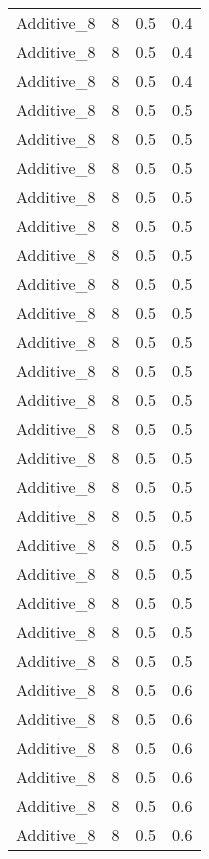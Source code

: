\documentclass{article}
\begin{document}
\begin{longtable}[H]{lrrr}
 Additive\_8 &       8 &   0.5 &            0.4 \\
 Additive\_8 &       8 &   0.5 &            0.4 \\
 Additive\_8 &       8 &   0.5 &            0.4 \\
 Additive\_8 &       8 &   0.5 &            0.5 \\
 Additive\_8 &       8 &   0.5 &            0.5 \\
 Additive\_8 &       8 &   0.5 &            0.5 \\
 Additive\_8 &       8 &   0.5 &            0.5 \\
 Additive\_8 &       8 &   0.5 &            0.5 \\
 Additive\_8 &       8 &   0.5 &            0.5 \\
 Additive\_8 &       8 &   0.5 &            0.5 \\
 Additive\_8 &       8 &   0.5 &            0.5 \\
 Additive\_8 &       8 &   0.5 &            0.5 \\
 Additive\_8 &       8 &   0.5 &            0.5 \\
 Additive\_8 &       8 &   0.5 &            0.5 \\
 Additive\_8 &       8 &   0.5 &            0.5 \\
 Additive\_8 &       8 &   0.5 &            0.5 \\
 Additive\_8 &       8 &   0.5 &            0.5 \\
 Additive\_8 &       8 &   0.5 &            0.5 \\
 Additive\_8 &       8 &   0.5 &            0.5 \\
 Additive\_8 &       8 &   0.5 &            0.5 \\
 Additive\_8 &       8 &   0.5 &            0.5 \\
 Additive\_8 &       8 &   0.5 &            0.5 \\
 Additive\_8 &       8 &   0.5 &            0.5 \\
 Additive\_8 &       8 &   0.5 &            0.6 \\
 Additive\_8 &       8 &   0.5 &            0.6 \\
 Additive\_8 &       8 &   0.5 &            0.6 \\
 Additive\_8 &       8 &   0.5 &            0.6 \\
 Additive\_8 &       8 &   0.5 &            0.6 \\
 Additive\_8 &       8 &   0.5 &            0.6 \\

\end{longtable}
\end{document}
